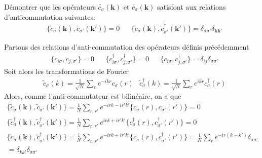 \documentclass{subfiles}[../main.tex]
\begin{document}
            \begin{problem}
                Démontrer que les opérateurs
                $\widetilde{c_\sigma}(\bm{k})$ et
                $\widetilde{c_\sigma}(\bm{k})$ satisfont
                aux relations d'anticommutation suivantes:
                \begin{align}
                    &\{\widetilde{c}_\sigma(\bm{k}),
                    \widetilde{c}_{\sigma'}(\bm{k'})\}=0
                    &&\{\widetilde{c}_\sigma(\bm{k}),
                    \widetilde{c}_{\sigma'}^\dagger(\bm{k'}
                    )\}=\delta_{\sigma\sigma'}
                    \delta_{\bm{k}\bm{k'}}
                \end{align}
            \end{problem}
            Partons des relations d'anti-commutation des opérateurs définis
            précédemment
            \begin{align}
                &\{c_{i\sigma},c_{j,\sigma'}\}=0
                &&\{c^\dagger_{i\sigma},c^\dagger_{j,\sigma'}\}=0
                &&\{c_{i\sigma},c^\dagger_{j,\sigma'}\}=\delta_{ij}
                \delta_{\sigma\sigma'}
            \end{align}
            Soit alors les transformations de Fourier
            \begin{align}
                &\widetilde{c}_{\sigma}(k)=\frac{1}{\sqrt{N}}\sum_re^{-ikr}
                c_{\sigma}(r)
                &\widetilde{c}^\dagger_{\sigma}(k)=\frac{1}{\sqrt{N}}\sum_re^{ikr}
                c^\dagger_{\sigma}(r)
            \end{align}
            Alors, comme l'anti-commutateur est bilinéaire, on a que
            \begin{align}
                \{\widetilde{c}_\sigma(\bm{k}),
                    \widetilde{c}_{\sigma'}(\bm{k'})\}
                    =\frac1N\sum_{r,r'}e^{-irk-ir'k'}\{c_{\sigma}(r),
                    c_{\sigma'}(r')\}=0\\
                \{\widetilde{c}^\dagger_\sigma(\bm{k}),
                    \widetilde{c}^\dagger_{\sigma'}(\bm{k'})\}
                    =\frac1N\sum_{r,r'}e^{irk+ir'k'}\{c^\dagger_{\sigma}(r),
                    c^\dagger_{\sigma'}(r')\}=0\\
                \{\widetilde{c}_\sigma(\bm{k}),
                    \widetilde{c}^\dagger_{\sigma'}(\bm{k'})\}
                    =\frac1N\sum_{r,r'}e^{-irk+ir'k'}\{c_{\sigma}(r),
                    c^\dagger_{\sigma'}(r')\}=\frac1N\sum_re^{-ir(k-k')}
                    \delta_{\sigma\sigma'}\\
                    =\delta_{kk'}\delta_{\sigma\sigma'}
            \end{align}
\end{document}
